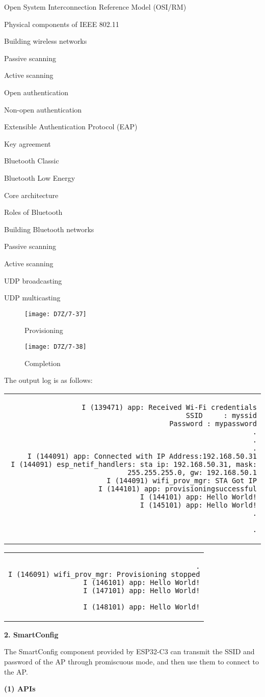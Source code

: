 \documentclass[a4paper,12pt]{book}
\begin{document}
\begin{term}{Open System Interconnection Reference Model (OSI/RM)}
\begin{term}{Physical components of IEEE 802.11}
\begin{term}{Building wireless networks}
\begin{term}{Passive scanning}
\begin{term}{Active scanning}
\begin{term}{Open authentication}
\begin{term}{Non-open authentication}
\begin{term}{Extensible Authentication Protocol (EAP)}
\begin{term}{Key agreement}
\begin{term}{Bluetooth Classic}
\begin{term}{Bluetooth Low Energy}
\begin{term}{Core architecture}
\begin{term}{Roles of Bluetooth}
\begin{term}{Building Bluetooth networks}
\begin{term}{Passive scanning}
\begin{term}{Active scanning}
\begin{term}{UDP broadcasting}
\begin{term}{UDP multicasting}
\begin{figure}[!h]
  \Centering
  \begin{minipage}[b]{0.4\textwidth}
    \texttt{[image: D7Z/7-37]}
    \caption{Provisioning}
  \end{minipage}\hspace{1em}
  \begin{minipage}[b]{0.4\textwidth}
    \texttt{[image: D7Z/7-38]}
    \caption{Completion}
  \end{minipage}
\end{figure}

The output log is as follows:


\fontsize{8pt}{8pt}\selectfont
\begin{tabular}{d}
\vspace{2pt}
\begin{verbatim}
I (139471) app: Received Wi-Fi credentials
          SSID     : myssid
          Password : mypassword
          .
          .
          .
I (144091) app: Connected with IP Address:192.168.50.31
I (144091) esp_netif_handlers: sta ip: 192.168.50.31, mask: 255.255.255.0, gw: 192.168.50.1
I (144091) wifi_prov_mgr: STA Got IP
I (144101) app: provisioningsuccessful
I (144101) app: Hello World!
I (145101) app: Hello World!
          .
\end{verbatim}
\verb|          .|
\end{tabular}



\fontsize{8pt}{8pt}\selectfont
\begin{tabular}{d}
\vspace{2pt}
\begin{verbatim}
          .
I (146091) wifi_prov_mgr: Provisioning stopped
I (146101) app: Hello World!
I (147101) app: Hello World!
\end{verbatim}
\verb|I (148101) app: Hello World!|
\end{tabular}


\textbf{2. SmartConfig}

The SmartConfig component provided by ESP32-C3 can transmit the SSID and password of the AP through promiscuous mode, and then use them to connect to the AP.

\textbf{(1) APIs}


\end{term}
\end{term}
\end{term}
\end{term}
\end{term}
\end{term}
\end{term}
\end{term}
\end{term}
\end{term}
\end{term}
\end{term}
\end{term}
\end{term}
\end{term}
\end{term}
\end{term}
\end{term}
\end{document}
